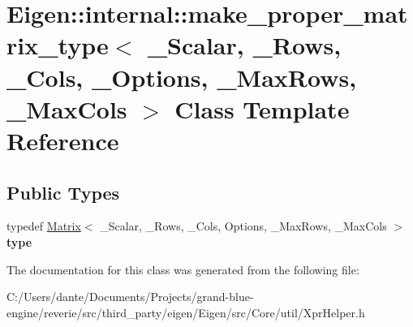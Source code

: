 \hypertarget{class_eigen_1_1internal_1_1make__proper__matrix__type}{}\section{Eigen\+::internal\+::make\+\_\+proper\+\_\+matrix\+\_\+type$<$ \+\_\+\+Scalar, \+\_\+\+Rows, \+\_\+\+Cols, \+\_\+\+Options, \+\_\+\+Max\+Rows, \+\_\+\+Max\+Cols $>$ Class Template Reference}
\label{class_eigen_1_1internal_1_1make__proper__matrix__type}
\subsection*{Public Types}
\begin{DoxyCompactItemize}
\item 
\mbox{\label{class_eigen_1_1internal_1_1make__proper__matrix__type_abf151c04157051de10e26fcca2bea915}} 
typedef \mbox{\hyperlink{class_eigen_1_1_matrix}{Matrix}}$<$ \+\_\+\+Scalar, \+\_\+\+Rows, \+\_\+\+Cols, Options, \+\_\+\+Max\+Rows, \+\_\+\+Max\+Cols $>$ {\bfseries type}
\end{DoxyCompactItemize}


The documentation for this class was generated from the following file\+:\begin{DoxyCompactItemize}
\item 
C\+:/\+Users/dante/\+Documents/\+Projects/grand-\/blue-\/engine/reverie/src/third\+\_\+party/eigen/\+Eigen/src/\+Core/util/Xpr\+Helper.\+h\end{DoxyCompactItemize}
